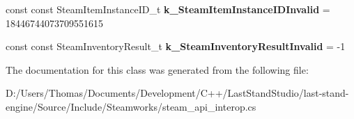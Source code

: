 \begin{DoxyCompactItemize}
\item 
\hypertarget{classValve_1_1Steamworks_1_1SteamAPI_abd35d05c1819058513c1d8ffe47ecb62}{}const const Steam\+Item\+Instance\+I\+D\+\_\+t {\bfseries k\+\_\+\+Steam\+Item\+Instance\+I\+D\+Invalid} = 18446744073709551615\label{classValve_1_1Steamworks_1_1SteamAPI_abd35d05c1819058513c1d8ffe47ecb62}

\item 
\hypertarget{classValve_1_1Steamworks_1_1SteamAPI_ab9340ccacc599390c5a1e53b267b10ea}{}const const Steam\+Inventory\+Result\+\_\+t {\bfseries k\+\_\+\+Steam\+Inventory\+Result\+Invalid} = -\/1\label{classValve_1_1Steamworks_1_1SteamAPI_ab9340ccacc599390c5a1e53b267b10ea}

\end{DoxyCompactItemize}


The documentation for this class was generated from the following file\+:\begin{DoxyCompactItemize}
\item 
D\+:/\+Users/\+Thomas/\+Documents/\+Development/\+C++/\+Last\+Stand\+Studio/last-\/stand-\/engine/\+Source/\+Include/\+Steamworks/steam\+\_\+api\+\_\+interop.\+cs\end{DoxyCompactItemize}
